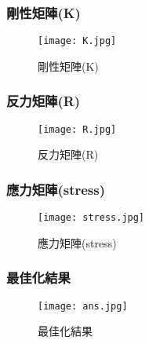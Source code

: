 \documentclass{article}
\begin{document}
\begin{CJK}{UTF8}{bsmi}
        \subsubsection{剛性矩陣(K)}
        \begin{figure}[H]
            \centering
            \texttt{[image: K.jpg]}
            \caption{剛性矩陣(K)}
            \label{fig:enter-label}
        \end{figure}
        
        \subsubsection{反力矩陣(R)}
        \begin{figure}[H]
            \centering
            \texttt{[image: R.jpg]}
            \caption{反力矩陣(R)}
            \label{fig:enter-label}
        \end{figure}
        
        \subsubsection{應力矩陣(stress)}
        \begin{figure}[H]
            \centering
            \texttt{[image: stress.jpg]}
            \caption{應力矩陣(stress)}
            \label{fig:enter-label}
        \end{figure}
        
        \subsubsection{最佳化結果}
        \begin{figure}[H]
            \centering
            \texttt{[image: ans.jpg]}
            \caption{最佳化結果}
            \label{fig:enter-label}
        \end{figure}


\end{CJK}
\end{document}

